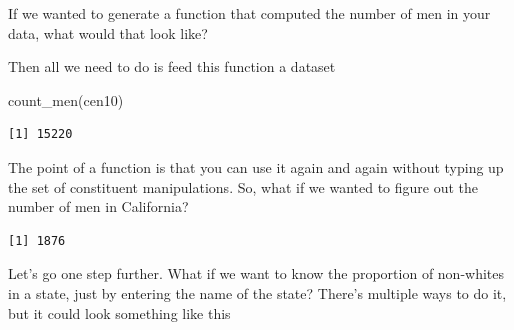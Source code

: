 \documentclass[
  letterpaper,
]{book}
\newenvironment{Shaded}{\begin{snugshade}}{\end{snugshade}}
\newcommand{\ControlFlowTok}[1]{\textcolor[rgb]{0.00,0.23,0.31}{#1}}
\newcommand{\FunctionTok}[1]{\textcolor[rgb]{0.28,0.35,0.67}{#1}}
\newcommand{\NormalTok}[1]{\textcolor[rgb]{0.00,0.23,0.31}{#1}}
\newcommand{\OtherTok}[1]{\textcolor[rgb]{0.00,0.23,0.31}{#1}}
\newcommand{\SpecialCharTok}[1]{\textcolor[rgb]{0.37,0.37,0.37}{#1}}
\newcommand{\StringTok}[1]{\textcolor[rgb]{0.13,0.47,0.30}{#1}}
\theoremstyle{definition}
\theoremstyle{definition}
\theoremstyle{plain}
\theoremstyle{definition}
\theoremstyle{plain}
\theoremstyle{plain}
\theoremstyle{remark}
\begin{document}
If we wanted to generate a function that computed the number of men in
your data, what would that look like?

\begin{Shaded}
\end{Shaded}

Then all we need to do is feed this function a dataset

\begin{Shaded}
\begin{Highlighting}[]
\FunctionTok{count\_men}\NormalTok{(cen10)}
\end{Highlighting}
\end{Shaded}

\begin{verbatim}
[1] 15220
\end{verbatim}

The point of a function is that you can use it again and again without
typing up the set of constituent manipulations. So, what if we wanted to
figure out the number of men in California?

\begin{Shaded}
\end{Shaded}

\begin{verbatim}
[1] 1876
\end{verbatim}

Let's go one step further. What if we want to know the proportion of
non-whites in a state, just by entering the name of the state? There's
multiple ways to do it, but it could look something like this

\begin{Shaded}
\end{Shaded}
\end{document}
